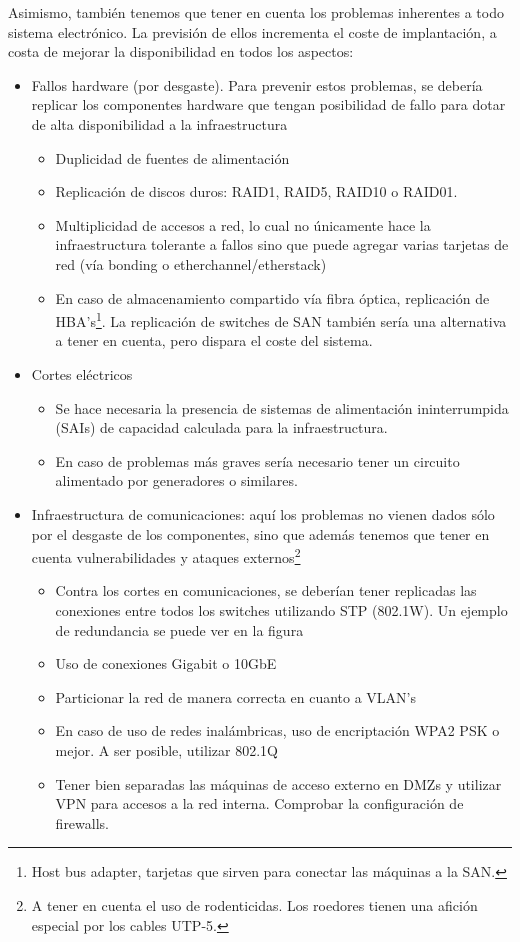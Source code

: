 Asimismo, también tenemos que tener en cuenta los problemas inherentes a todo sistema electrónico. La previsión de ellos incrementa el coste de implantación, a costa de mejorar la disponibilidad en todos los aspectos:
\begin{itemize}
	\item{Fallos hardware (por desgaste). Para prevenir estos problemas, se debería replicar los componentes hardware que tengan posibilidad de fallo para dotar de alta disponibilidad a la infraestructura}
	\begin{itemize}
		\item{Duplicidad de fuentes de alimentación }
		\item{Replicación de discos duros: RAID1, RAID5, RAID10 o RAID01. }
		\item{Multiplicidad de accesos a red, lo cual no únicamente hace la infraestructura tolerante a fallos sino que puede agregar varias tarjetas de red (vía bonding o etherchannel/etherstack) }
		\item{En caso de almacenamiento compartido vía fibra óptica, replicación de HBA's\footnote{Host bus adapter, tarjetas que sirven para conectar las máquinas a la SAN.}. La replicación de switches de SAN también sería una alternativa a tener en cuenta, pero dispara el coste del sistema. }
	\end{itemize}

	\item{Cortes eléctricos}
	\begin{itemize}
		\item{Se hace necesaria la presencia de sistemas de alimentación ininterrumpida (SAIs) de capacidad calculada para la infraestructura.}
		\item{En caso de problemas más graves sería necesario tener un circuito alimentado por generadores o similares.}
	\end{itemize}

	\item{Infraestructura de comunicaciones: aquí los problemas no vienen dados sólo por el desgaste de los componentes, sino que además tenemos que tener en cuenta vulnerabilidades y ataques externos\footnote{A tener en cuenta el uso de rodenticidas. Los roedores tienen una afición especial por los cables UTP-5.}}
	\begin{itemize}
		\item{Contra los cortes en comunicaciones, se deberían tener replicadas las conexiones entre todos los switches utilizando STP (802.1W). Un ejemplo de redundancia se puede ver en la figura }
		\item{Uso de conexiones Gigabit o 10GbE }
		\item{Particionar la red de manera correcta en cuanto a VLAN's}
		\item{En caso de uso de redes inalámbricas, uso de encriptación WPA2 PSK o mejor. A ser posible, utilizar 802.1Q}
		\item{Tener bien separadas las máquinas de acceso externo en DMZs y utilizar VPN para accesos a la red interna. Comprobar la configuración de firewalls.}
	\end{itemize}


\end{itemize}
